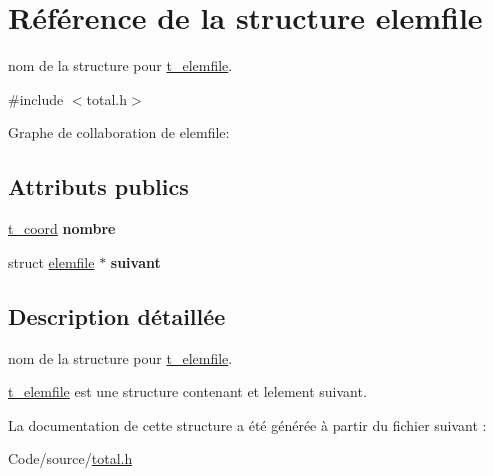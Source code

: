 \hypertarget{structelemfile}{}\section{Référence de la structure elemfile}
\label{structelemfile}


nom de la structure pour \hyperlink{structt__elemfile}{t\+\_\+elemfile}.  




{\ttfamily \#include $<$total.\+h$>$}



Graphe de collaboration de elemfile\+:
\subsection*{Attributs publics}
\begin{DoxyCompactItemize}
\item 
\hyperlink{structt__coord}{t\+\_\+coord} {\bfseries nombre}\hypertarget{structelemfile_a50473116d79b1083db184bc369e6a046}{}\label{structelemfile_a50473116d79b1083db184bc369e6a046}

\item 
struct \hyperlink{structelemfile}{elemfile} $\ast$ {\bfseries suivant}\hypertarget{structelemfile_ac30f23198c9ecf2929d10096f7ffcc3f}{}\label{structelemfile_ac30f23198c9ecf2929d10096f7ffcc3f}

\end{DoxyCompactItemize}


\subsection{Description détaillée}
nom de la structure pour \hyperlink{structt__elemfile}{t\+\_\+elemfile}. 

\hyperlink{structt__elemfile}{t\+\_\+elemfile} est une structure contenant et l\textquotesingle{}element suivant. 

La documentation de cette structure a été générée à partir du fichier suivant \+:\begin{DoxyCompactItemize}
\item 
Code/source/\hyperlink{total_8h}{total.\+h}\end{DoxyCompactItemize}
